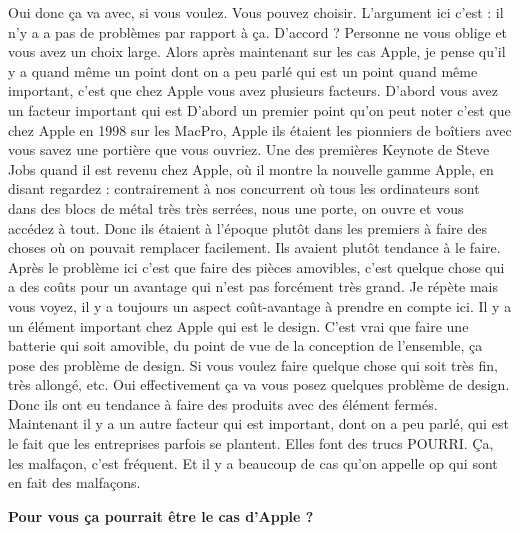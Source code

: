 \begin{small}
Oui donc ça va avec, si vous voulez. Vous pouvez choisir. L'argument ici c'est : il n'y a a pas de problèmes par rapport à ça. D'accord ? Personne ne vous oblige et vous avez un choix large. Alors après maintenant sur les cas Apple, je pense qu'il y a quand même un point dont on a peu parlé qui est un point quand même important, c'est que chez Apple vous avez plusieurs facteurs. D'abord vous avez un facteur important qui est 
D'abord un premier point qu'on peut noter c'est que chez Apple en 1998 sur les MacPro, Apple ils étaient les pionniers de boîtiers avec vous savez une portière que vous ouvriez. Une des premières Keynote de Steve Jobs quand il est revenu chez Apple, où il montre la nouvelle gamme Apple, en disant regardez : contrairement à nos concurrent où tous les ordinateurs sont dans des blocs de métal très très serrées, nous une porte, on ouvre et vous accédez à tout. Donc ils étaient à l'époque plutôt dans les premiers à faire des choses où on pouvait remplacer facilement. Ils avaient plutôt tendance à le faire.
Après le problème ici c'est que faire des pièces amovibles, c'est quelque chose qui a des coûts pour un avantage qui n'est pas forcément très grand. Je répète mais vous voyez, il y a toujours un aspect coût-avantage à prendre en compte ici. 
Il y a un élément important chez Apple qui est le design. C'est vrai que faire une batterie qui soit amovible, du point de vue de la conception de l'ensemble, ça pose des problème de design. Si vous voulez faire quelque chose qui soit très fin, très allongé, etc. Oui effectivement ça va vous posez quelques problème de design. Donc ils ont eu tendance à faire des produits avec des élément fermés.
Maintenant il y a un autre facteur qui est important, dont on a peu parlé, qui est le fait que les entreprises parfois se plantent. Elles font des trucs POURRI. Ça, les malfaçon, c'est fréquent. Et il y a beaucoup de cas qu'on appelle op qui sont en fait des malfaçons.

\textbf{Pour vous ça pourrait être le cas d'Apple ?}
\smallbreak



\end{small}
